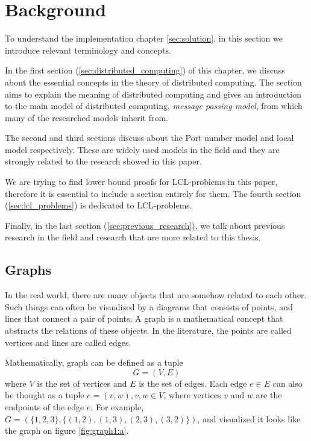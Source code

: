 \section{Background}
To understand the implementation chapter \ref{sec:solution}, in this section we introduce relevant terminology and concepts.


In the first section (\ref{sec:distributed_computing}) of this chapter, we discuss about the essential concepts in the theory of distributed computing.
The section aims to explain the meaning of distributed computing and gives an introduction to the main model of distributed computing, \emph{message passing model}, from which many of the researched models inherit from.

The second and third sections discuss about the Port number model and local model respectively.
These are widely used models in the field and they are strongly related to the research showed in this paper.

We are trying to find lower bound proofs for LCL-problems in this paper, therefore it is essential to include a section entirely for them.
The fourth section (\ref{sec:lcl_problems}) is dedicated to LCL-problems.

Finally, in the last section (\ref{sec:previous_research}), we talk about previous research in the field and research that are more related to this thesis.

\subsection{Graphs} \label{sec:graphs}
In the real world, there are many objects that are somehow related to each other.
Such things can often be visualized by a diagrams that consists of points, and lines that connect a pair of points.
A graph is a mathematical concept that abstracts the relations of these objects.
In the literature, the points are called vertices and lines are called edges.
\cite{DBLP:books/others/BondyM76}

Mathematically, graph can be defined as a tuple $$G = (V, E)$$ where $V$ is the set of vertices and $E$ is the set of edges.
Each edge $e \in E$ can also be thought as a tuple $e=(v, w), v, w \in V$, where vertices $v$ and $w$ are the endpoints of the edge $e$.
For example, $G=(\{1, 2, 3\}, \{(1, 2),(1, 3),(2, 3),(3, 2)\})$, and visualized it looks like the graph on figure \ref{fig:graph1:a}.

